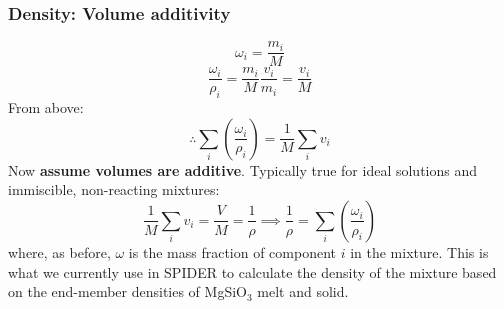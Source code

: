 \subsubsection{Density: Volume additivity}
\begin{equation}
\omega_i = \frac{m_i}{M}
\end{equation}
\begin{equation}
\frac{\omega_i}{\rho_i} = \frac{m_i}{M} \frac{v_i}{m_i} = \frac{v_i}{M}
\end{equation}
From above:
\begin{equation}
\therefore \sum_i \left( \frac{\omega_i}{\rho_i} \right) = \frac{1}{M} \sum_i v_i
\end{equation}
Now \textbf{assume volumes are additive}.  Typically true for ideal solutions and immiscible, non-reacting mixtures:
\begin{equation}
\frac{1}{M} \sum_i v_i = \frac{V}{M} = \frac{1}{\rho} \implies \frac{1}{\rho} = \sum_i \left( \frac{\omega_i}{\rho_i} \right)
\end{equation}
where, as before, $\omega$ is the mass fraction of component $i$ in the mixture.  This is what we currently use in SPIDER to calculate the density of the mixture based on the end-member densities of MgSiO$_3$ melt and solid.
